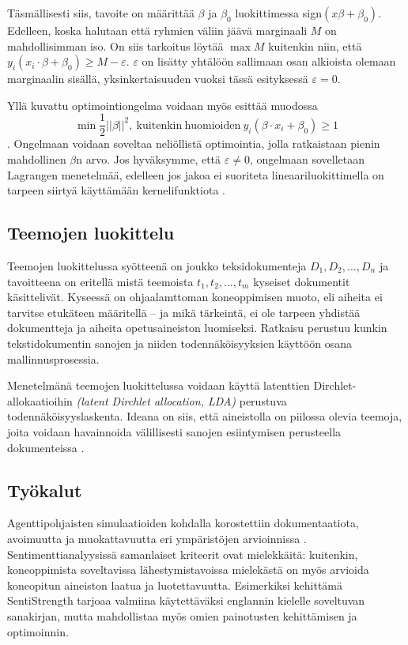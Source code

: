 \documentclass[finnish,gradu,twoside,12pt]{tktltiki}
\begin{document}
{Täsmällisesti siis, tavoite on määrittää $\beta$ ja $\beta_0$ luokittimessa sign$( x \beta + \beta_0)$. Edelleen, koska halutaan että ryhmien väliin jäävä marginaali $M$ on mahdollisimman iso. On siis tarkoitus löytää $\max M$ kuitenkin niin, että $y_i( x_i \cdot \beta + \beta_0 ) \geq M - \varepsilon$. $\varepsilon$ on lisätty yhtälöön sallimaan osan alkioista olemaan marginaalin sisällä, yksinkertaisuuden vuoksi tässä esityksessä $\varepsilon = 0$.

Yllä kuvattu optimointiongelma voidaan myös esittää muodossa $$ \min \frac{1}{2} || \beta ||^2,~\mathrm{kuitenkin~huomioiden}~y_i( \beta \cdot x_i + \beta_0 ) \geq 1$$. Ongelmaan voidaan soveltaa neliöllistä optimointia, jolla ratkaistaan pienin mahdollinen $\beta$n arvo. Jos hyväksymme, että $\varepsilon \neq 0$, ongelmaan  sovelletaan Lagrangen menetelmää, edelleen jos jakoa ei suoriteta lineaariluokittimella on tarpeen siirtyä käyttämään kernelifunktiota \citep{vapnik1982estimation,cortes95,Hastie2009}.

\subsection{Teemojen luokittelu}

Teemojen luokittelussa syötteenä on joukko teksidokumenteja $D_1, D_2, \ldots, D_n$ ja tavoitteena on eritellä mistä teemoista $t_1, t_2, \ldots, t_m$ kyseiset dokumentit käsittelivät. Kyseessä on ohjaalamttoman koneoppimisen muoto, eli aiheita ei tarvitse etukäteen määritellä -- ja mikä tärkeintä, ei ole tarpeen yhdistää dokumentteja ja aiheita opetusaineiston luomiseksi. Ratkaisu perustuu kunkin tekstidokumentin sanojen ja niiden todennäköisyyksien käyttöön osana mallinnusprosessia.

Menetelmänä teemojen luokittelussa voidaan käyttä latenttien Dirchlet-allokaatioihin \textit{(latent Dirchlet allocation, LDA)} perustuva todennäköisyyslaskenta. Ideana on siis, että aineistolla on piilossa olevia teemoja, joita voidaan havainnoida välillisesti sanojen esiintymisen perusteella dokumenteissa \citep{Blei2010,Blei2003}.

\subsection*{Työkalut}

Agenttipohjaisten simulaatioiden kohdalla korostettiin dokumentaatiota, avoimuutta ja muokattavuutta eri ympäristöjen arvioinnissa \citep{Tobias2004}. Sentimenttianalyysissä samanlaiset kriteerit ovat mielekkäitä: kuitenkin, koneoppimista soveltavissa lähestymistavoissa mielekästä on myös arvioida koneopitun aineiston laatua ja luotettavuutta. Esimerkiksi \citet{Thelwall2010} kehittämä SentiStrength tarjoaa valmiina käytettäväksi englannin kielelle soveltuvan sanakirjan, mutta mahdollistaa myös omien painotusten kehittämisen ja optimoinnin.

}
\end{document}
